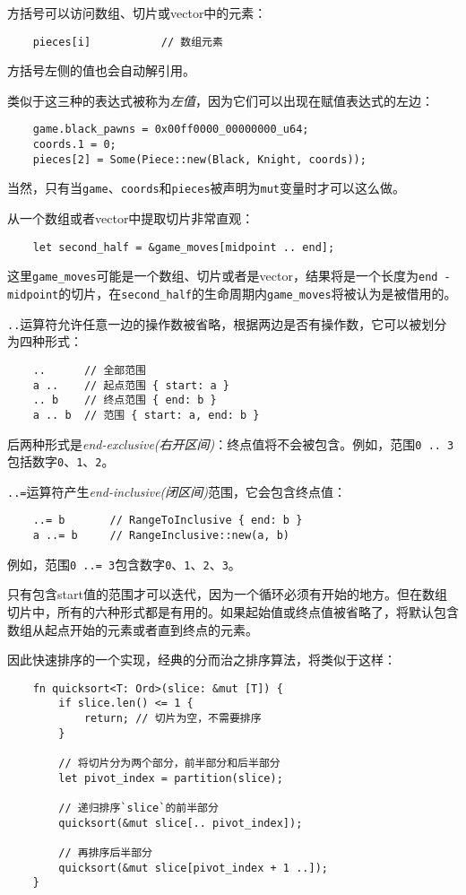 方括号可以访问数组、切片或vector中的元素：
\begin{verbatim}
    pieces[i]           // 数组元素
\end{verbatim}

方括号左侧的值也会自动解引用。

类似于这三种的表达式被称为\emph{左值}，因为它们可以出现在赋值表达式的左边：
\begin{verbatim}
    game.black_pawns = 0x00ff0000_00000000_u64;
    coords.1 = 0;
    pieces[2] = Some(Piece::new(Black, Knight, coords));
\end{verbatim}

当然，只有当\texttt{game}、\texttt{coords}和\texttt{pieces}被声明为\texttt{mut}变量时才可以这么做。

从一个数组或者vector中提取切片非常直观：
\begin{verbatim}
    let second_half = &game_moves[midpoint .. end];
\end{verbatim}

这里\texttt{game\_moves}可能是一个数组、切片或者是vector，结果将是一个长度为\texttt{end - midpoint}的切片，在\texttt{second\_half}的生命周期内\texttt{game\_moves}将被认为是被借用的。

\texttt{..}运算符允许任意一边的操作数被省略，根据两边是否有操作数，它可以被划分为四种形式：
\begin{verbatim}
    ..      // 全部范围
    a ..    // 起点范围 { start: a }
    .. b    // 终点范围 { end: b }
    a .. b  // 范围 { start: a, end: b }
\end{verbatim}

后两种形式是\emph{end-exclusive(右开区间)}：终点值将不会被包含。例如，范围\texttt{0 .. 3}包括数字\texttt{0}、\texttt{1}、\texttt{2}。

\texttt{..=}运算符产生\emph{end-inclusive(闭区间)}范围，它会包含终点值：
\begin{verbatim}
    ..= b       // RangeToInclusive { end: b }
    a ..= b     // RangeInclusive::new(a, b)
\end{verbatim}

例如，范围\texttt{0 ..= 3}包含数字\texttt{0}、\texttt{1}、\texttt{2}、\texttt{3}。

只有包含start值的范围才可以迭代，因为一个循环必须有开始的地方。但在数组切片中，所有的六种形式都是有用的。如果起始值或终点值被省略了，将默认包含数组从起点开始的元素或者直到终点的元素。

因此快速排序的一个实现，经典的分而治之排序算法，将类似于这样：
\begin{verbatim}
    fn quicksort<T: Ord>(slice: &mut [T]) {
        if slice.len() <= 1 {
            return; // 切片为空，不需要排序
        }

        // 将切片分为两个部分，前半部分和后半部分
        let pivot_index = partition(slice);

        // 递归排序`slice`的前半部分
        quicksort(&mut slice[.. pivot_index]);

        // 再排序后半部分
        quicksort(&mut slice[pivot_index + 1 ..]);
    }
\end{verbatim}

